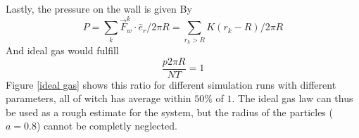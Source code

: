 \documentclass{article}
\begin{document}
        Lastly, the pressure on the wall is given By
        \begin{equation*}
            P = \sum_k \vec F_w^{k} \cdot \hat e_r / 2 \pi R = \sum_{r_k>R} K(r_k - R) / 2 \pi R
        \end{equation*}
        And ideal gas would fulfill
        \begin{equation*}
            \frac{p2\pi R}{N T} = 1
        \end{equation*}
        Figure \ref{ideal gas} shows this ratio for different simulation runs with different parameters, all of witch has average within $50\%$ of $1$. The ideal gas law can thus be used as a rough estimate for the system, but the radius of the particles ($a = 0.8$) cannot be completly neglected.
\end{document}
